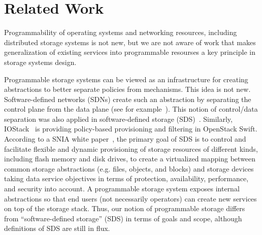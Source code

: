 \documentclass[preprint]{sigplanconf-eurosys}
\begin{document}
%
%
%

\section{Related Work}


Programmability of operating systems and networking resources, including
distributed storage systems is not new, but we are not aware of work that makes
generalization of existing services into programmable resourses a key principle
in storage systems design. 

Programmable storage systems can be viewed as an infrastructure for creating
abstractions to better separate policies from mechanisms. This idea is not new.
Software-defined networks (SDNs) create such an abstraction by separating the
control plane from the data plane (see for example~\cite{jain:sigcomm13}). This
notion of control/data separation was also applied in software-defined storage
(SDS)~\cite{thereska:sosp13,stefanovici:fast16}. Similarly,
IOStack~\cite{gracia:internet16} is providing policy-based provisioning and
filtering in OpenStack Swift. According to a SNIA white
paper~\cite{carlson:snia2014}, the primary goal of SDS is to control and
facilitate flexible and dynamic provisioning of storage resources of different
kinds, including flash memory and disk drives, to create a virtualized mapping
between common storage abstractions (e.g. files, objects, and blocks) and
storage devices taking data service objectives in terms of protection,
availability, performance, and security into account. A programmable storage
system exposes internal abstractions so that end users (not necessarily
operators) can create new services on top of the storage stack. Thus, our
notion of programmable storage differs from ``software-defined storage'' (SDS)
in terms of goals and scope, although definitions of SDS are still in flux.
\end{document}

